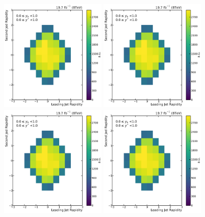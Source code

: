 \begin{figure}[htbp]
    \centering
    \includegraphics[width=0.45\textwidth]{figures/measurement/jet12_rapidity_yb0ys0.pdf}\hfill
    \includegraphics[width=0.45\textwidth]{figures/measurement/jet12_rapidity_yb0ys0.pdf}
    \includegraphics[width=0.45\textwidth]{figures/measurement/jet12_rapidity_yb0ys0.pdf}\hfill
    \includegraphics[width=0.45\textwidth]{figures/measurement/jet12_rapidity_yb0ys0.pdf}

\end{figure}
